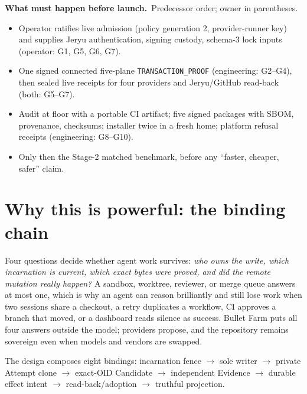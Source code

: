 \documentclass[11pt,letterpaper]{article}
\newenvironment{tight}{\setlength{\topsep}{1pt}\setlength{\partopsep}{0pt}\begin{itemize}\setlength{\itemsep}{1pt}\setlength{\parskip}{0pt}\setlength{\parsep}{0pt}}{\end{itemize}}
\newcommand{\block}[2]{\vspace{1pt}\textbf{#1}{\footnotesize\ #2}\par\vspace{-2pt}}
\begin{document}
\block{What must happen before launch.}{Predecessor order; owner in parentheses.}
\begin{tight}
\item Operator ratifies live admission (policy generation 2, provider-runner
key) and supplies Jeryu authentication, signing custody, schema-3 lock inputs
(operator: G1, G5, G6, G7).
\item One signed connected five-plane \texttt{TRANSACTION\_PROOF} (engineering:
G2--G4), then sealed live receipts for four providers and Jeryu/GitHub
read-back (both: G5--G7).
\item Audit at floor with a portable CI artifact; five signed packages with
SBOM, provenance, checksums; installer twice in a fresh home; platform
refusal receipts (engineering: G8--G10).
\item Only then the Stage-2 matched benchmark, before any ``faster, cheaper,
safer'' claim.
\end{tight}
\normalsize

\newpage
\section*{Why this is powerful: the binding chain}

Four questions decide whether agent work survives: \emph{who owns the write,
which incarnation is current, which exact bytes were proved, and did the remote
mutation really happen?} A sandbox, worktree, reviewer, or merge queue answers
at most one, which is why an agent can reason brilliantly and still lose work
when two sessions share a checkout, a retry duplicates a workflow, CI approves
a branch that moved, or a dashboard reads silence as success. Bullet Farm puts
all four answers outside the model; providers propose, and the repository
remains sovereign even when models and vendors are swapped.

\begin{center}
\resizebox{.8\textwidth}{!}{\BulletArchitectureFigure{\textwidth}}
\end{center}

The design composes eight bindings: incarnation fence $\rightarrow$ sole
writer $\rightarrow$ private Attempt clone $\rightarrow$ exact-OID Candidate
$\rightarrow$ independent Evidence $\rightarrow$ durable effect intent
$\rightarrow$ read-back/adoption $\rightarrow$ truthful projection.
\end{document}
